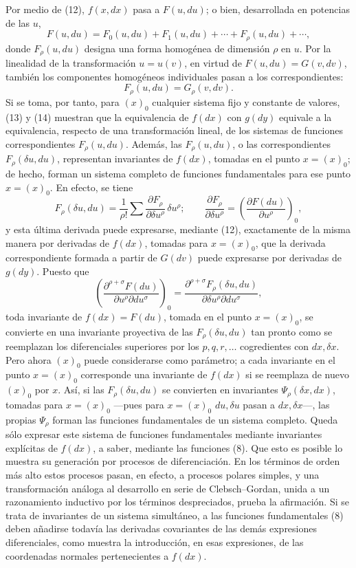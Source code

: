 Por medio de (12), \(f(x,dx)\) pasa a \(F(u,du)\); o bien, desarrollada en
potencias de las \(u\),
\begin{equation}
F(u,du)=F_0(u,du)+F_1(u,du)+\cdots+F_\rho(u,du)+\cdots,
\tag{13}
\end{equation}
donde \(F_\rho(u,du)\) designa una forma homogénea de dimensión \(\rho\) en
\(u\). Por la linealidad de la transformación \(u=u(v)\), en virtud de
\(F(u,du)=G(v,dv)\), también los componentes homogéneos individuales pasan a
los correspondientes:
\begin{equation}
F_\rho(u,du)=G_\rho(v,dv).
\tag{14}
\end{equation}
Si se toma, por tanto, para \((x)_0\) cualquier sistema fijo y constante de
valores, (13) y (14) muestran que la equivalencia de \(f(dx)\) con \(g(dy)\)
equivale a la equivalencia, respecto de una transformación lineal, de los
sistemas de funciones correspondientes \(F_\rho(u,du)\). Además, las
\(F_\rho(u,du)\), o las correspondientes \(F_\rho(\delta u,du)\), representan
invariantes de \(f(dx)\), tomadas en el punto \(x=(x)_0\); de hecho, forman un
sistema completo de funciones fundamentales para ese punto \(x=(x)_0\). En
efecto, se tiene
\[
F_\rho(\delta u,du)=\frac1{\rho!}\sum
\frac{\partial F_\rho}{\partial \delta u^\rho}\,\delta u^\rho;
\qquad
\frac{\partial F_\rho}{\partial \delta u^\rho}
=\left(\frac{\partial F(du)}{\partial u^\rho}\right)_0,
\]
y esta última derivada puede expresarse, mediante (12), exactamente de la misma
manera por derivadas de \(f(dx)\), tomadas para \(x=(x)_0\), que la derivada
correspondiente formada a partir de \(G(dv)\) puede expresarse por derivadas de
\(g(dy)\). Puesto que
\[
\left(\frac{\partial^{\rho+\sigma}F(du)}
{\partial u^\rho\partial du^\sigma}\right)_0
=
\frac{\partial^{\rho+\sigma}F_\rho(\delta u,du)}
{\partial\delta u^\rho\partial du^\sigma},
\]
toda invariante de \(f(dx)=F(du)\), tomada en el punto \(x=(x)_0\), se convierte
en una invariante proyectiva de las \(F_\rho(\delta u,du)\) tan pronto como se
reemplazan los diferenciales superiores por los \(p,q,r,\ldots\) cogredientes
con \(dx,\delta x\). Pero ahora \((x)_0\) puede considerarse como parámetro; a
cada invariante en el punto \(x=(x)_0\) corresponde una invariante de \(f(dx)\)
si se reemplaza de nuevo \((x)_0\) por \(x\). Así, si las
\(F_\rho(\delta u,du)\) se convierten en invariantes
\(\Psi_\rho(\delta x,dx)\), tomadas para \(x=(x)_0\) ---pues para \(x=(x)_0\)
\(du,\delta u\) pasan a \(dx,\delta x\)---, las propias \(\Psi_\rho\) forman las
funciones fundamentales de un sistema completo. Queda sólo expresar este sistema
de funciones fundamentales mediante invariantes explícitas de \(f(dx)\), a saber,
mediante las funciones (8). Que esto es posible lo muestra su generación por
procesos de diferenciación. En los términos de orden más alto estos procesos
pasan, en efecto, a procesos polares simples, y una transformación análoga al
desarrollo en serie de Clebsch--Gordan, unida a un razonamiento inductivo por
los términos despreciados, prueba la afirmación. Si se trata de invariantes de
un sistema simultáneo, a las funciones fundamentales (8) deben añadirse todavía
las derivadas covariantes de las demás expresiones diferenciales, como muestra
la introducción, en esas expresiones, de las coordenadas normales pertenecientes
a \(f(dx)\).

